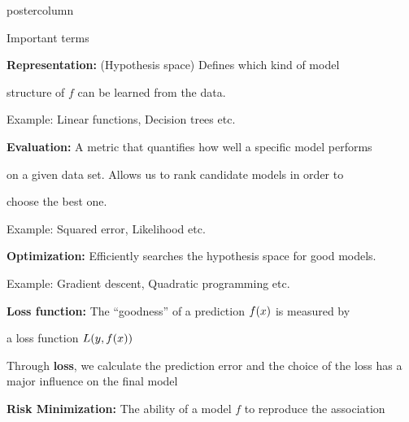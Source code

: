 \documentclass{beamer}
\begin{document}
\begin{frame}[fragile]{}
\begin{columns}
\begin{column}{.31\textwidth}
\begin{beamercolorbox}[center]{postercolumn}
\begin{minipage}{.98\textwidth}
{\begin{myblock}{Important terms}
						\vspace*{0.5ex}
						\begin{codebox}
							 \textbf{Representation: }(Hypothesis space) Defines which kind of model
						\end{codebox}
						\begin{codebox}
						 structure of \(f\) can be learned from the data.
						\end{codebox}
						\hspace*{1ex}Example: Linear functions, Decision trees etc.
						
						\vspace*{0.5ex}
						\begin{codebox}
						    \textbf{Evaluation: }A metric that quantifies how well a specific model performs
						\end{codebox}
						\begin{codebox}
						    on a given data set. Allows us to rank candidate models in order to
						\end{codebox}
						\begin{codebox}
						    choose the best one.
						\end{codebox}
						\hspace*{1ex}Example: Squared error, Likelihood etc.
						
						\vspace*{0.5ex}
						\begin{codebox}
							 \textbf{Optimization: }Efficiently searches the hypothesis space for good models.
						\end{codebox}
						\hspace*{1ex}Example: Gradient descent, Quadratic programming etc.
						
						\begin{codebox}
							 \textbf{Loss function: }The \enquote{goodness} of a prediction $f(x)$ is measured by
						\end{codebox}
						\begin{codebox}
							 a loss function $L(y, f(x))$
						\end{codebox} \hspace*{1ex}Through \textbf{loss}, we calculate the prediction error and the choice of the \hspace*{1ex}loss has a major influence on the final model
						
	             \begin{codebox}
							 \textbf{Risk Minimization: }The ability of a model $f$ to reproduce the association
						\end{codebox}
						

\end{myblock}}
\end{minipage}
\end{beamercolorbox}
\end{column}
\end{columns}
\end{frame}
\end{document}
